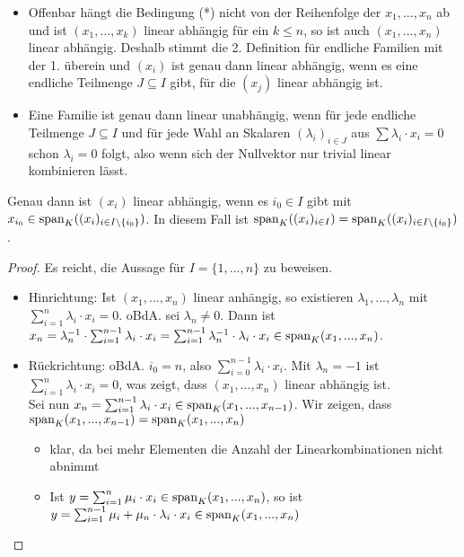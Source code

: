 \begin{remark}
	\begin{itemize}
		\item Offenbar hängt die Bedingung (*) nicht von der Reihenfolge der $x_1,...,x_n$ ab und ist $(x_1,...,x_k)$ linear 
		abhängig für ein $k \le n$, so ist auch $(x_1,...,x_n)$ linear abhängig. Deshalb stimmt die 2. Definition für 
		endliche Familien mit der 1. überein und $(x_i)$ ist genau dann linear abhängig, wenn es eine endliche Teilmenge 
		$J \subseteq I$ gibt, für die $(x_j)$ linear abhängig ist.
		\item Eine Familie ist genau dann linear unabhängig, wenn für jede endliche Teilmenge $J\subseteq I$ und für jede 
		Wahl an Skalaren $(\lambda_i)_{i\in J}$ aus $\sum \lambda_i\cdot x_i=0$ schon $\lambda_i=0$ folgt, also wenn sich 
		der Nullvektor nur trivial linear kombinieren lässt. 
	\end{itemize}
\end{remark}

\begin{proposition}
	Genau dann ist $(x_i)$ linear abhängig, wenn es $i_0 \in I$ gibt mit $x_{i_0} \in \operatorname{span}_K((x_i)_{i\in 
		I\backslash\{i_0\}})$. In diesem Fall ist $\operatorname{span}_K((x_i)_{i\in I})=\operatorname{span}_K((x_i)_{i\in I\backslash\{i_0\}})$.
\end{proposition}
\begin{proof}
	Es reicht, die Aussage für $I=\{1,...,n\}$ zu beweisen.
	\begin{itemize}
		\item Hinrichtung: Ist $(x_1,...,x_n)$ linear anhängig, so existieren $\lambda_1,...,\lambda_n$ mit $\sum_{i=1}^n 
		\lambda_i\cdot x_i=0$. oBdA. sei $\lambda_n\neq 0$. Dann ist $x_n=\lambda_n^{-1}\cdot\sum_{i=1}^{n-1} \lambda_i
		\cdot x_i=\sum_{i=1}^{n-1} \lambda_n^{-1}\cdot\lambda_i\cdot x_i \in \operatorname{span}_K(x_1,...,x_n)$.
		\item Rückrichtung: oBdA. $i_0=n$, also $\sum_{i=0}^{n-1} \lambda_i\cdot x_i$. Mit $\lambda_n=-1$ ist $\sum
		_{i=1}^n \lambda_i\cdot x_i=0$, was zeigt, dass $(x_1,...,x_n)$ linear abhängig ist. \\
		Sei nun $x_n=\sum_{i=1}^{n-1} \lambda_i\cdot x_i \in \operatorname{span}_K(x_1,...,x_{n-1})$. Wir zeigen, dass $\operatorname{span}_K(x_1,...,
		x_{n-1})=\operatorname{span}_K(x_1,...,x_n)$
		\begin{itemize}
			\item klar, da bei mehr Elementen die Anzahl der Linearkombinationen nicht abnimmt
			\item Ist $y=\sum_{i=1}^n \mu_i\cdot x_i \in \operatorname{span}_K(x_1,...,x_n)$, so ist $y=\sum_{i=1}^{n-1} \mu_i+
			\mu_n\cdot \lambda_i\cdot x_i \in \operatorname{span}_K(x_1,...,x_n)$
		\end{itemize}
	\end{itemize}
\end{proof}


